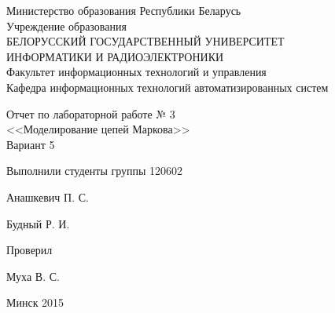 \thispagestyle{empty}
\setlength{\parindent}{0ex} %

\begin{center}
  Министерство образования Республики Беларусь \\
  \vspace{0.5ex}
  Учреждение образования \\
  БЕЛОРУССКИЙ ГОСУДАРСТВЕННЫЙ УНИВЕРСИТЕТ \\
  ИНФОРМАТИКИ И РАДИОЭЛЕКТРОНИКИ \\
  \vspace{0.5ex}
  Факультет информационных технологий и управления \\
  \vspace{0.5ex}
  Кафедра информационных технологий автоматизированных систем
\end{center}

\vspace{50mm}

\begin{center}
  Отчет по лабораторной работе № 3 \\
  <<Моделирование цепей Маркова>> \\
  Вариант 5
\end{center}

\vspace{50mm}

\begin{minipage}{.55\linewidth}
    Выполнили студенты группы 120602
    \bigskip
\end{minipage}
\hfill
\begin{minipage}{.4\linewidth}
  \begin{flushright}
    Анашкевич П. С.

    Будный Р. И.
  \end{flushright}
\end{minipage}

\vspace{10mm}

\begin{minipage}{.55\linewidth}
    Проверил
\end{minipage}
\hfill
\begin{minipage}{.4\linewidth}
  \begin{flushright}
    Муха В. С.

  \end{flushright}
\end{minipage}

\vspace{30mm}
\begin{center}
  Минск 2015
\end{center}

\setlength{\parindent}{5ex} %

\newpage
